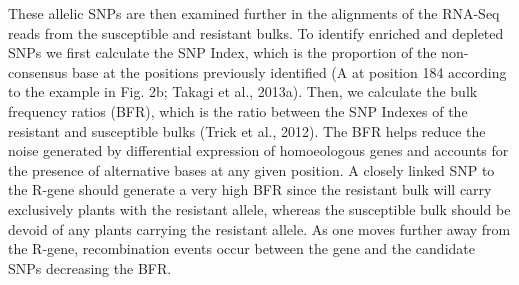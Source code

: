 These allelic SNPs are then examined further in the alignments of the RNA-Seq reads from the susceptible and resistant bulks. To identify enriched and depleted SNPs we first calculate the SNP Index, which is the proportion of the non-consensus base at the positions previously identified (A at position 184 according to the example in Fig. 2b; Takagi et al., 2013a). Then, we calculate the bulk frequency ratios (BFR), which is the ratio between the SNP Indexes of the resistant and susceptible bulks (Trick et al., 2012). The BFR helps reduce the noise generated by differential expression of homoeologous genes and accounts for the presence of alternative bases at any given position. A closely linked SNP to the R-gene should generate a very high BFR since the resistant bulk will carry exclusively plants with the resistant allele, whereas the susceptible bulk should be devoid of any plants carrying the resistant allele. As one moves further away from the R-gene, recombination events occur between the gene and the candidate SNPs decreasing the BFR.




